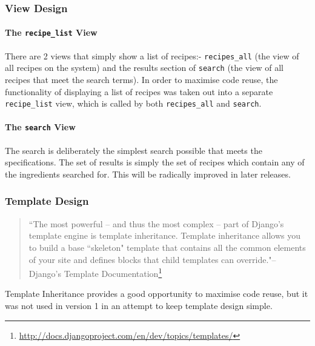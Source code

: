 \subsubsection{View Design}

\paragraph{The \texttt{recipe\_list} View}

There are 2 views that simply show a list of recipes:- \texttt{recipes\_all} (the view of all recipes on the system) and the results section of \texttt{search} (the view of all recipes that meet the search terms). In order to maximise code reuse, the functionality of displaying a list of recipes was taken out into a separate \texttt{recipe\_list} view, which is called by both \texttt{recipes\_all} and \texttt{search}.

\paragraph{The \texttt{search} View}

The search is deliberately the simplest search possible that meets the specifications. The set of results is simply the set of recipes which contain any of the ingredients searched for. This will be radically improved in later releases.

\subsubsection{Template Design}

\begin{samepage}
\begin{quote}
``The most powerful -- and thus the most complex -- part of Django's template engine is template inheritance. Template inheritance allows you to build a base ``skeleton" template that contains all the common elements of your site and defines blocks that child templates can override."\flushright-- Django's Template Documentation\footnote{\url{http://docs.djangoproject.com/en/dev/topics/templates/}}
\end{quote}
\end{samepage}

\noindent Template Inheritance provides a good opportunity to maximise code reuse, but it was not used in version 1 in an attempt to keep template design simple.













